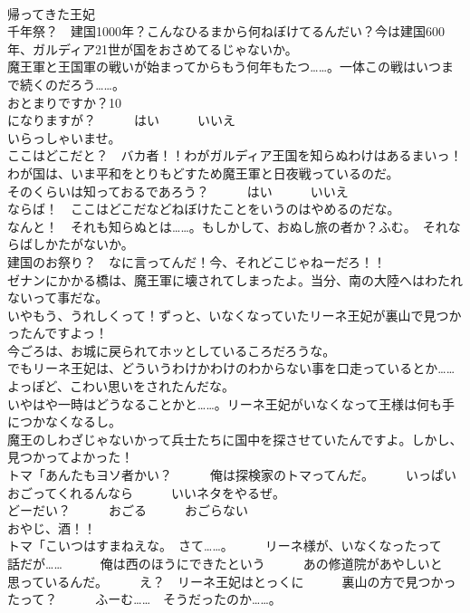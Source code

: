 \documentclass[8pt]{extreport}
\begin{document}
\begin{CJK}{UTF8}{min}
\\	帰ってきた王妃	
\\	千年祭？　建国1000年？こんなひるまから何ねぼけてるんだい？今は建国600年、ガルディア21世が国をおさめてるじゃないか。	
\\	魔王軍と王国軍の戦いが始まってからもう何年もたつ……。一体この戦はいつまで続くのだろう……。	
\\	おとまりですか？10
\\	になりますが？　　　はい　　　いいえ	
\\	いらっしゃいませ。	
\\	ここはどこだと？　バカ者！！わがガルディア王国を知らぬわけはあるまいっ！	
\\	わが国は、いま平和をとりもどすため魔王軍と日夜戦っているのだ。	
\\	そのくらいは知っておるであろう？　　　はい　　　いいえ	
\\	ならば！　ここはどこだなどねぼけたことをいうのはやめるのだな。	
\\	なんと！　それも知らぬとは……。もしかして、おぬし旅の者か？ふむ。　それならばしかたがないか。	
\\	建国のお祭り？　なに言ってんだ！今、それどこじゃねーだろ！！	
\\	ゼナンにかかる橋は、魔王軍に壊されてしまったよ。当分、南の大陸へはわたれないって事だな。	
\\	いやもう、うれしくって！ずっと、いなくなっていたリーネ王妃が裏山で見つかったんですよっ！	
\\	今ごろは、お城に戻られてホッとしているころだろうな。	
\\	でもリーネ王妃は、どういうわけかわけのわからない事を口走っているとか……よっぽど、こわい思いをされたんだな。	
\\	いやはや一時はどうなることかと……。リーネ王妃がいなくなって王様は何も手につかなくなるし。	
\\	魔王のしわざじゃないかって兵士たちに国中を探させていたんですよ。しかし、見つかってよかった！	
\\	トマ「あんたもヨソ者かい？　　　俺は探検家のトマってんだ。　　　いっぱいおごってくれるんなら　　　いいネタをやるぜ。	
\\	どーだい？　　　おごる　　　おごらない	
\\	おやじ、酒！！	
\\	トマ「こいつはすまねえな。　さて……。　　　リーネ様が、いなくなったって　　　話だが……　　　俺は西のほうにできたという　　　あの修道院があやしいと　　　思っているんだ。　　　え？　リーネ王妃はとっくに　　　裏山の方で見つかったって？　　　ふーむ……　そうだったのか……。	

\end{CJK}
\end{document}
